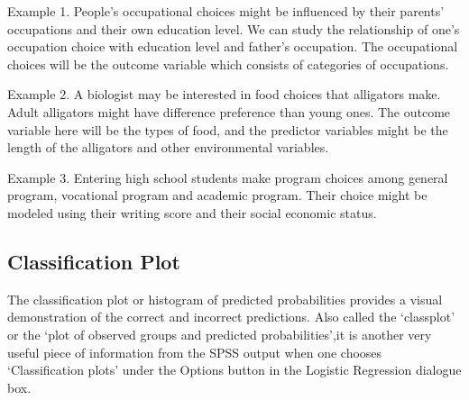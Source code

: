 \documentclass[12pt]{article}
\begin{document}
Example 1. People's occupational choices might be influenced by their parents' occupations and their own education level. We can study the relationship of one's occupation choice with education level and father's occupation.  The occupational choices will be the outcome variable which consists of categories of occupations.

Example 2. A biologist may be interested in food choices that alligators make. Adult alligators might have difference preference than young ones. The outcome variable here will be the types of food, and the predictor variables might be the length of the alligators and other environmental variables.

Example 3. Entering high school students make program choices among general program, vocational program and academic program. Their choice might be modeled using their writing score and their social economic status.

\subsection{Classification Plot} 
The classification plot or histogram of predicted probabilities
provides a visual demonstration of the correct and incorrect predictions. Also called the ‘classplot’ or the ‘plot of observed groups and predicted probabilities’,it is another very useful piece of information from the SPSS output when one chooses
‘Classification plots’ under the Options button in the Logistic Regression dialogue box.
\end{document}
